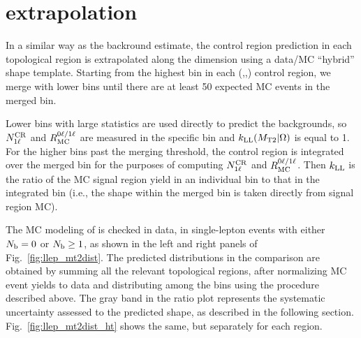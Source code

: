 \section{\texorpdfstring{\mttwo}{MT2} extrapolation}
\label{sec:llep_mt2}

In a similar way as the \znunu backround estimate, the control region prediction in each topological region is
extrapolated along the \mttwo dimension using a data/MC ``hybrid'' shape template.
Starting from the highest \mttwo bin in each (\Ht,\Nj,\Nb) control region, we merge with lower bins until
there are at least 50 expected MC events in the merged bin. 

Lower \mttwo bins with large statistics are used directly
to predict the backgrounds, so $N_{\mathrm{1\ell}}^{\mathrm{CR}}$ and $R_{\mathrm{MC}}^{0\ell/1\ell}$ are measured in the specific
\mttwo bin and $k_{\mathrm{LL}}(M_{\mathrm{T2}}|\Omega)$ is equal to 1.
For the higher \mttwo bins past the merging threshold, the control region is integrated over the merged bin
for the purposes of computing $N_{\mathrm{1\ell}}^{\mathrm{CR}}$ and $R_{\mathrm{MC}}^{0\ell/1\ell}$. Then $k_{\mathrm{LL}}$ is the 
ratio of the MC signal region yield in an individual \mttwo bin to that in the integrated bin (i.e., the \mttwo
shape within the merged bin is taken directly from signal region MC).

The MC modeling of \mttwo is checked in data, in single-lepton events with either $N_{\mathrm{b}}=0$ or $N_{\mathrm{b}}\geq1$, as
shown in the left and right panels of Fig.~\ref{fig:llep_mt2dist}. The predicted distributions in the comparison
are obtained by summing all the relevant topological regions, after normalizing MC event yields to data
and distributing among the \mttwo bins using the procedure described above. The gray band in the ratio plot represents the
systematic uncertainty assessed to the predicted \mttwo shape, as described in the following section.
Fig.~\ref{fig:llep_mt2dist_ht} shows the same, but separately for each \Ht region.

